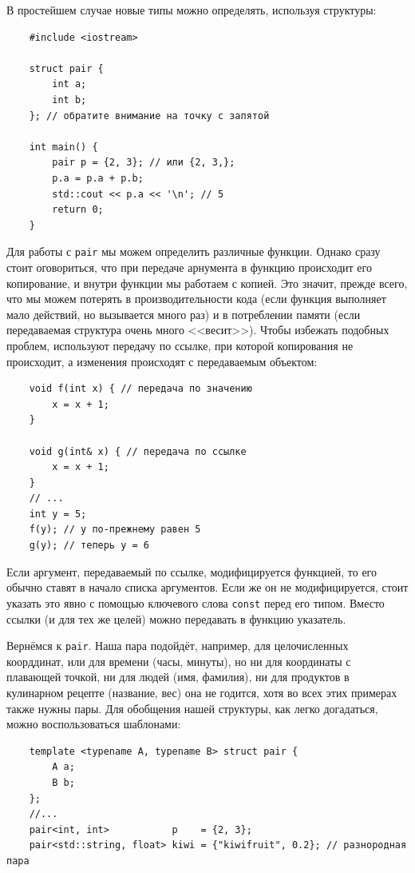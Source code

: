 \documentclass{book}
\begin{document}
В простейшем случае новые типы можно определять, используя структуры:
\begin{verbatim}
    #include <iostream>

    struct pair {
        int a;
        int b;
    }; // обратите внимание на точку с запятой

    int main() {
        pair p = {2, 3}; // или {2, 3,};
        p.a = p.a + p.b;
        std::cout << p.a << '\n'; // 5
        return 0;
    }
\end{verbatim}
Для работы с \texttt{pair} мы можем определить различные функции. Однако сразу стоит
оговориться, что при передаче арнумента в функцию происходит его копирование, и внутри функции мы
работаем с копией. Это значит, прежде всего, что мы можем потерять в производительности кода (если
функция выполняет мало действий, но вызывается много раз) и в потреблении памяти (если передаваемая
структура очень много <<весит>>). Чтобы избежать подобных проблем, используют передачу по ссылке,
при которой копирования не происходит, а изменения происходят с передаваемым объектом:
\begin{verbatim}
    void f(int x) { // передача по значению
        x = x + 1; 
    }

    void g(int& x) { // передача по ссылке
        x = x + 1; 
    }
    // ... 
    int y = 5; 
    f(y); // y по-прежнему равен 5
    g(y); // теперь y = 6
\end{verbatim}
Если аргумент, передаваемый по ссылке, модифицируется функцией, то его обычно ставят в начало
списка аргументов. Если же он не модифицируется, стоит указать это явно с помощью ключевого слова
\texttt{const} перед его типом. Вместо ссылки (и для тех же целей) можно передавать в
функцию указатель.

Вернёмся к \texttt{pair}.  Наша пара подойдёт, например, для целочисленных коорддинат, или
для времени (часы, минуты), но ни для координаты с плавающей точкой, ни для людей (имя, фамилия),
ни для продуктов в кулинарном рецепте (название, вес) она не годится, хотя во всех этих примерах
также нужны пары. Для обобщения нашей структуры, как легко догадаться, можно воспользоваться
шаблонами:
\begin{verbatim}
    template <typename A, typename B> struct pair {
        A a;
        B b;
    };
    //...
    pair<int, int>           p    = {2, 3};
    pair<std::string, float> kiwi = {"kiwifruit", 0.2}; // разнородная пара
\end{verbatim}
\end{document}
